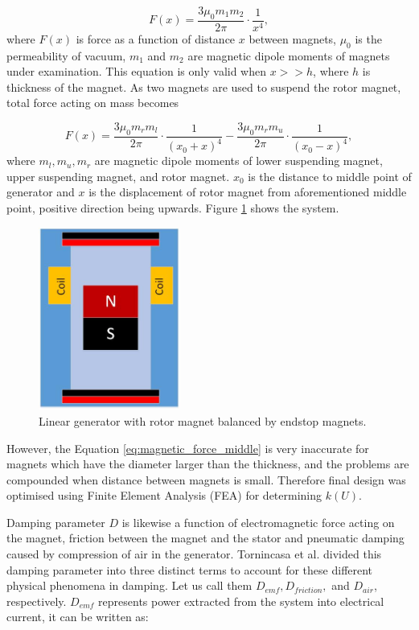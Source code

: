 \begin{equation}\label{eq:magnetic_force}
  F(x) = \frac{3 \mu_0 m_1 m_2}{2 \pi} \cdot \frac{1}{x^4},
\end{equation}
where $F(x)$ is force as a function of distance $x$ between magnets, $\mu_0$ is the permeability of vacuum, $ m_1 $ and $ m_2 $ are magnetic dipole moments of magnets under examination. This equation is only valid when $x >> h$, where $h$ is thickness of the magnet. As two magnets are used to suspend the rotor magnet, total force acting on mass becomes 

\begin{equation}\label{eq:magnetic_force_middle}
  F(x) = \frac{3 \mu_0 m_r m_l}{2 \pi} \cdot \frac{1}{(x_0+x)^4} - \frac{3 \mu_0 m_r m_u}{2 \pi} \cdot \frac{1}{(x_0-x)^4},
\end{equation}
where $m_l, m_u, m_r$ are magnetic dipole moments of lower suspending magnet, upper suspending magnet, and rotor magnet. $x_0$ is the distance to middle point of generator and $x$ is the displacement of rotor magnet from aforementioned middle point, positive direction being upwards. Figure \ref{fig:lg} shows the system.

\begin{figure}[htb]
\begin{center}
\includegraphics[height=6cm]{images/own_dwg/generator}
\end{center}
\caption{Linear generator with rotor magnet balanced by endstop magnets.}
\label{fig:lg}
\end{figure}

However, the Equation \eqref{eq:magnetic_force_middle} is very inaccurate for magnets which have the diameter larger than the thickness, and the problems are compounded when distance between magnets is small. Therefore final design was optimised using Finite Element Analysis (FEA) for determining $k(U)$. 

Damping parameter $D$ is likewise a function of electromagnetic force acting on the magnet, friction between the magnet and the stator and pneumatic damping caused by compression of air in the generator. Tornincasa et al. \cite{Tornincasa2012} divided this damping parameter into three distinct terms to account for these different physical phenomena in damping. Let us call them $D_{emf}, D_{friction},$ and $D_{air}$, respectively. $D_{emf}$ represents power extracted from the system into electrical current, it can be written as:


